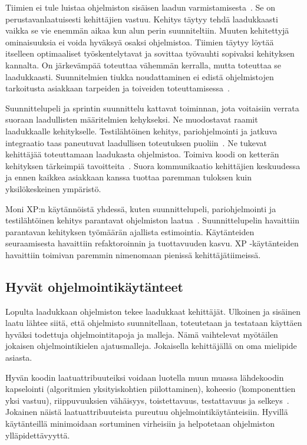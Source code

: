 \documentclass[finnish]{../tktltiki2}
\theoremstyle{definition}
\theoremstyle{remark}
\begin{document}
    Tiimien ei tule luistaa ohjelmiston sisäisen laadun varmistamisesta~\cite{Kn07}. Se on perustavanlaatuisesti 
kehittäjien vastuu. Kehitys täytyy tehdä laadukkaasti vaikka se vie enemmän aikaa kun alun perin suunniteltiin. Muuten 
kehitettyjä ominaisuuksia ei voida hyväksyä osaksi ohjelmistoa. Tiimien täytyy löytää itselleen optimaaliset 
työskentelytavat ja sovittaa työvauhti sopivaksi kehityksen kannalta. On järkevämpää toteuttaa vähemmän kerralla, mutta 
toteuttaa se laadukkaasti. Suunnitelmien tiukka noudattaminen ei edistä ohjelmistojen tarkoitusta asiakkaan tarpeiden ja 
toiveiden toteuttamisessa~\cite{HC01}.

    Suunnittelupeli ja sprintin suunnittelu kattavat toiminnan, jota voitaisiin verrata suoraan laadullisten
määritelmien kehykseksi. Ne muodostavat raamit laadukkaalle kehitykselle. Testilähtöinen kehitys, pariohjelmointi ja 
jatkuva integraatio taas paneutuvat laadullisen toteutuksen puoliin~\cite{SS10}. Ne tukevat kehittäjää toteuttamaan 
laadukasta ohjelmistoa. Toimiva koodi on ketterän kehityksen tärkeimpiä tavoitteita~\cite{HC01}. Suora kommunikaatio 
kehittäjien keskuudessa ja ennen kaikkea asiakkaan kanssa tuottaa paremman tuloksen kuin yksilökeskeinen ympäristö.

    Moni XP:n käytännöistä yhdessä, kuten suunnittelupeli, pariohjelmointi ja testilähtöinen kehitys parantavat 
ohjelmiston laatua~\cite{SS10}. Suunnittelupelin havaittiin parantavan kehityksen työmäärän ajallista estimointia. 
Käytänteiden seuraamisesta havaittiin refaktoroinnin ja tuottavuuden kasvu. XP -käytänteiden havaittiin toimivan 
paremmin nimenomaan pienissä kehittäjätiimeissä.

\subsection{Hyvät ohjelmointikäytänteet}

Lopulta laadukkaan ohjelmiston tekee laadukkaat kehittäjät. Ulkoinen ja sisäinen laatu lähtee siitä, että ohjelmisto 
suunnitellaan, toteutetaan ja testataan käyttäen hyväksi todettuja ohjelmointitapoja ja malleja. Nämä vaihtelevat 
myötäilen jokaisen ohjelmointikielen ajatusmalleja. Jokaisella kehittäjällä on oma mielipide asiasta.

    Hyvän koodin laatuattribuuteiksi voidaan luotella muun muassa lähdekoodin kapselointi (algoritmien yksityiskohtien 
piilottaminen), koheesio (komponenttien yksi vastuu), riippuvuuksien vähäisyys, toistettavuus, testattavuus ja 
selkeys~\cite{Sc08}. Jokainen näistä laatuattribuuteista pureutuu ohjelmointikäytänteisiin. Hyvillä käytänteillä 
minimoidaan sortuminen virheisiin ja helpotetaan ohjelmiston ylläpidettävyyttä.
\end{document}

